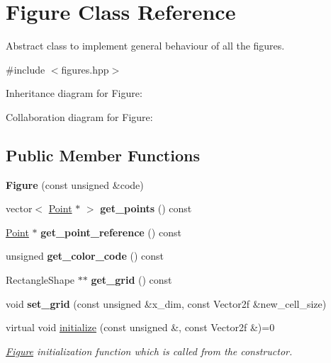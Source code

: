 \hypertarget{classFigure}{}\section{Figure Class Reference}
\label{classFigure}


Abstract class to implement general behaviour of all the figures.  




{\ttfamily \#include $<$figures.\+hpp$>$}



Inheritance diagram for Figure\+:


Collaboration diagram for Figure\+:
\subsection*{Public Member Functions}
\begin{DoxyCompactItemize}
\item 
\mbox{\label{classFigure_adefab08c75354df391ff59e14416a801}} 
{\bfseries Figure} (const unsigned \&code)
\item 
\mbox{\label{classFigure_a02313436279f653e67f2827e2ff8b6ce}} 
vector$<$ \hyperlink{classPoint}{Point} $\ast$ $>$ {\bfseries get\+\_\+points} () const
\item 
\mbox{\label{classFigure_a7fea93f1461a68e658e48212972d553f}} 
\hyperlink{classPoint}{Point} $\ast$ {\bfseries get\+\_\+point\+\_\+reference} () const
\item 
\mbox{\label{classFigure_a451b83d1077400f2a5bf3b6d2ed178c0}} 
unsigned {\bfseries get\+\_\+color\+\_\+code} () const
\item 
\mbox{\label{classFigure_afc07fa419fafde2e0af45434c44f9683}} 
Rectangle\+Shape $\ast$$\ast$ {\bfseries get\+\_\+grid} () const
\item 
\mbox{\label{classFigure_a2db1d1a48c2e980b5958864687bff235}} 
void {\bfseries set\+\_\+grid} (const unsigned \&x\+\_\+dim, const Vector2f \&new\+\_\+cell\+\_\+size)
\item 
\mbox{\label{classFigure_a623820756f0bea0a23410c0adb10c6f3}} 
virtual void \hyperlink{classFigure_a623820756f0bea0a23410c0adb10c6f3}{initialize} (const unsigned \&, const Vector2f \&)=0
\begin{DoxyCompactList}\small\item\em \hyperlink{classFigure}{Figure} initialization function which is called from the constructor. \end{DoxyCompactList}\end{DoxyCompactItemize}
